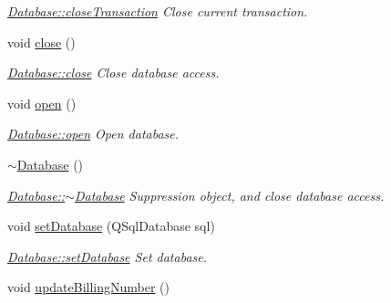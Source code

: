 \begin{DoxyCompactItemize}
\begin{DoxyCompactList}\small\item\em \hyperlink{classDatabases_1_1Database_a56faa5446bd58e6b3c3a4c503d9309b1}{Database\+::close\+Transaction} Close current transaction. \end{DoxyCompactList}\item 
\hypertarget{classDatabases_1_1Database_a56127c397e3c424401d59d64cdb8e8fc}{}void \hyperlink{classDatabases_1_1Database_a56127c397e3c424401d59d64cdb8e8fc}{close} ()\label{classDatabases_1_1Database_a56127c397e3c424401d59d64cdb8e8fc}

\begin{DoxyCompactList}\small\item\em \hyperlink{classDatabases_1_1Database_a56127c397e3c424401d59d64cdb8e8fc}{Database\+::close} Close database access. \end{DoxyCompactList}\item 
\hypertarget{classDatabases_1_1Database_a53c4c277c2fbd3532d2bcaa1d47aed40}{}void \hyperlink{classDatabases_1_1Database_a53c4c277c2fbd3532d2bcaa1d47aed40}{open} ()\label{classDatabases_1_1Database_a53c4c277c2fbd3532d2bcaa1d47aed40}

\begin{DoxyCompactList}\small\item\em \hyperlink{classDatabases_1_1Database_a53c4c277c2fbd3532d2bcaa1d47aed40}{Database\+::open} Open database. \end{DoxyCompactList}\item 
\hypertarget{classDatabases_1_1Database_a457a2dac579f1ffc743f452a2dcbbd5c}{}\hyperlink{classDatabases_1_1Database_a457a2dac579f1ffc743f452a2dcbbd5c}{$\sim$\+Database} ()\label{classDatabases_1_1Database_a457a2dac579f1ffc743f452a2dcbbd5c}

\begin{DoxyCompactList}\small\item\em \hyperlink{classDatabases_1_1Database_a457a2dac579f1ffc743f452a2dcbbd5c}{Database\+::$\sim$\+Database} Suppression object, and close database access. \end{DoxyCompactList}\item 
void \hyperlink{classDatabases_1_1Database_a88af2050b210c0d829d166f0f6d9e318}{set\+Database} (Q\+Sql\+Database sql)
\begin{DoxyCompactList}\small\item\em \hyperlink{classDatabases_1_1Database_a88af2050b210c0d829d166f0f6d9e318}{Database\+::set\+Database} Set database. \end{DoxyCompactList}\item 
\hypertarget{classDatabases_1_1Database_a17b652086514e0a64d0e452a938ac7a5}{}void \hyperlink{classDatabases_1_1Database_a17b652086514e0a64d0e452a938ac7a5}{update\+Billing\+Number} ()\label{classDatabases_1_1Database_a17b652086514e0a64d0e452a938ac7a5}


\end{DoxyCompactItemize}
